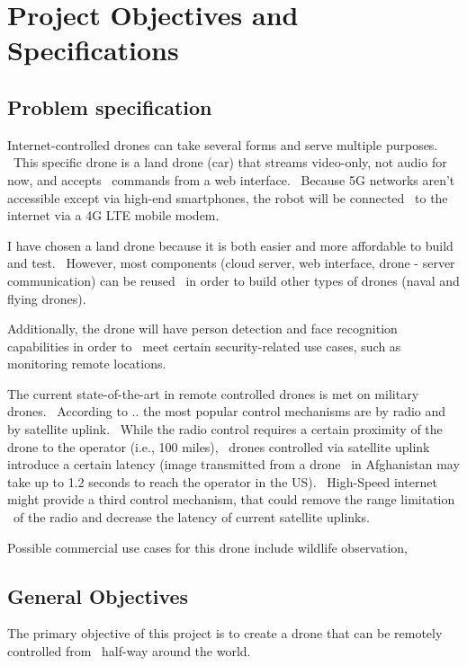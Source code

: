 \usepackage{graphicx}


\chapter{Project Objectives and Specifications}
\label{ch:specification}

\section{Problem specification}
\label{sec:specification-specification}

Internet-controlled drones can take several forms and serve multiple purposes. \
This specific drone is a land drone (car) that streams video-only, not audio for now, and accepts \
commands from a web interface. \
Because 5G networks aren't accessible except via high-end smartphones, the robot will be connected \
to the internet via a 4G LTE mobile modem.

I have chosen a land drone because it is both easier and more affordable to build and test. \
However, most components (cloud server, web interface, drone - server communication) can be reused \
in order to build other types of drones (naval and flying drones).

Additionally, the drone will have person detection and face recognition capabilities in order to \
meet certain security-related use cases, such as monitoring remote locations.

The current state-of-the-art in remote controlled drones is met on military drones. \
According to .. %
the most popular control mechanisms are by radio and by satellite uplink. \
While the radio control requires a certain proximity of the drone to the operator (i.e., 100 miles), \
drones controlled via satellite uplink introduce a certain latency (image transmitted from a drone \
in Afghanistan may take up to 1.2 seconds to reach the operator in the US). \
High-Speed internet might provide a third control mechanism, that could remove the range limitation \
of the radio and decrease the latency of current satellite uplinks.

Possible commercial use cases for this drone include wildlife observation,


\section{General Objectives}
\label{sec:specification-objectives}
The primary objective of this project is to create a drone that can be remotely controlled from \
half-way around the world.


